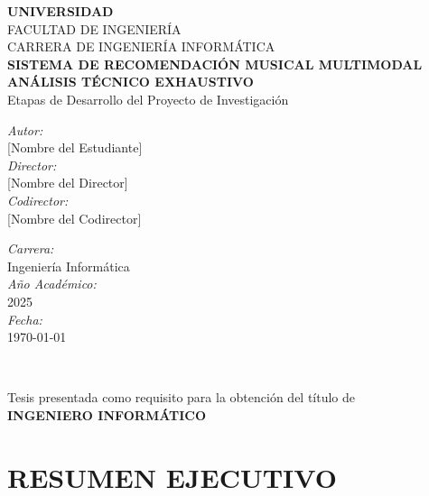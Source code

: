 \documentclass[12pt,a4paper]{report}
\begin{document}
\begin{titlepage}
\begin{center}

\vspace*{1cm}

{\Large \textbf{UNIVERSIDAD}}\\[0.5cm]
{\large FACULTAD DE INGENIERÍA}\\[0.5cm]
{\large CARRERA DE INGENIERÍA INFORMÁTICA}\\[3cm]

{\Large \textbf{SISTEMA DE RECOMENDACIÓN MUSICAL MULTIMODAL}}\\[0.5cm]
{\Large \textbf{ANÁLISIS TÉCNICO EXHAUSTIVO}}\\[0.5cm]
{\large Etapas de Desarrollo del Proyecto de Investigación}\\[2cm]

\begin{minipage}{0.4\textwidth}
\begin{flushleft} \large
\emph{Autor:}\\
{[Nombre del Estudiante]}\\[0.3cm]
\emph{Director:}\\
{[Nombre del Director]}\\[0.3cm]
\emph{Codirector:}\\
{[Nombre del Codirector]}
\end{flushleft}
\end{minipage}
\begin{minipage}{0.4\textwidth}
\begin{flushright} \large
\emph{Carrera:} \\
Ingeniería Informática\\[0.3cm]
\emph{Año Académico:} \\
2025\\[0.3cm]
\emph{Fecha:} \\
\today
\end{flushright}
\end{minipage}\\[2cm]

\vfill

{\large Tesis presentada como requisito para la obtención del título de}\\[0.5cm]
{\Large \textbf{INGENIERO INFORMÁTICO}}

\end{center}
\end{titlepage}

\chapter*{RESUMEN EJECUTIVO}
\end{document}
